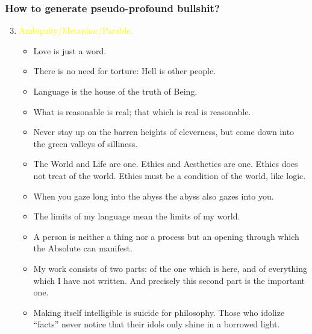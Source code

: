 \documentclass[UTF8,11pt,colorlinks,compress,openany]{beamer}%
\begin{document}
\begin{frame}\frametitle{How to generate pseudo-profound bullshit?}
	\begin{enumerate}\setcounter{enumi}{2}
		\item \textcolor{yellow}{Ambiguity/Metaphor/Parable.}
		\begin{itemize}
			\item Love is just a word.
			\item There is no need for torture: Hell is other people.
			\item Language is the house of the truth of Being.
			\item What is reasonable is real; that which is real is reasonable.
			\item Never stay up on the barren heights of cleverness, but come down into the green valleys of silliness.
			\item The World and Life are one. Ethics and Aesthetics are one. Ethics does not treat of the world. Ethics must be a condition of the world, like logic.
			\item When you gaze long into the abyss the abyss also gazes into you.
			\item The limits of my language mean the limits of my world.
			\item A person is neither a thing nor a process but an opening through which the Absolute can manifest.
			\item My work consists of two parts: of the one which is here, and of everything which I have not written. And precisely this second part is the important one.
			\item Making itself intelligible is suicide for philosophy. Those who idolize ``facts'' never notice that their idols only shine in a borrowed light.
		\end{itemize}
	\end{enumerate}
\end{frame}
\end{document}
